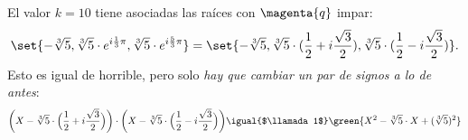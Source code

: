 El valor $k = 10$ tiene asociadas las raíces con $\magenta{q}$ impar:
$$
  \set{-\sqrt[3]{5}, \sqrt[3]{5} \cdot e^{i\frac{1}{3}\pi}, \sqrt[3]{5} \cdot e^{i\frac{5}{3}\pi} } =
  \set{-\sqrt[3]{5}, \sqrt[3]{5} \cdot ( \frac{1}{2} + i\frac{\sqrt{3}}{2}), \sqrt[3]{5} \cdot ( \frac{1}{2} - i\frac{\sqrt{3}}{2}) }.
$$
Esto es igual de horrible, pero solo \textit{hay que cambiar un par de signos a lo de antes}:
$$
  \bigg(X - \sqrt[3]{5} \cdot \Big( \frac{1}{2} + i\frac{\sqrt{3}}{2}\Big)\bigg)
  \cdot
  \bigg(X - \sqrt[3]{5} \cdot \Big( \frac{1}{2} - i\frac{\sqrt{3}}{2}\Big)\bigg)
  \igual{$\llamada1$}
  \green{X^2  - \sqrt[3]{5} \cdot X + (\sqrt[3]{5})^2}
$$

\begin{aportes}
  \item {}
\end{aportes}
